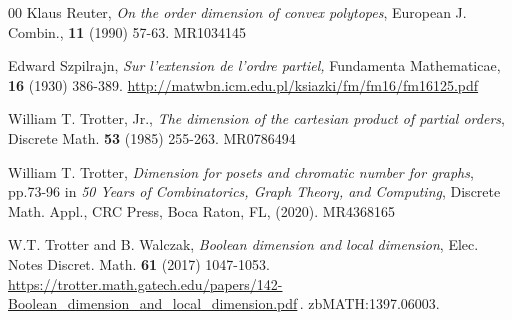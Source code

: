 \documentclass{amsart}
\numberwithin{equation}{section}
\numberwithin{theorem}{section}
\newcommand{\2}{\mathbf{2}}
\begin{document}
\begin{thebibliography}{00}
 Klaus Reuter,
{\em On the order dimension of convex polytopes},
European J. Combin., {\bf 11} (1990) 57-63.
MR1034145

 Edward Szpilrajn,
{\em Sur l'extension de l'ordre partiel,}
Fundamenta Mathematicae, {\bf 16} (1930) 386-389.
\url{http://matwbn.icm.edu.pl/ksiazki/fm/fm16/fm16125.pdf}

 William T. Trotter, Jr.,
{\em The dimension of the cartesian product of partial orders},
Discrete Math. {\bf 53} (1985) 255-263.
MR0786494

 William T. Trotter,
{\em Dimension for posets and chromatic number for graphs}, pp.73-96 in
{\em 50 Years of Combinatorics, Graph Theory, and Computing},
Discrete Math. Appl.,
CRC Press, Boca Raton, FL, (2020).
MR4368165

 W.T. Trotter and B. Walczak,
{\em Boolean dimension and local dimension},
Elec. Notes Discret. Math. {\bf 61} (2017) 1047-1053.
\url{https://trotter.math.gatech.edu/papers/142-Boolean_dimension_and_local_dimension.pdf}\,.
zbMATH:1397.06003.

\end{thebibliography}
\end{document}
